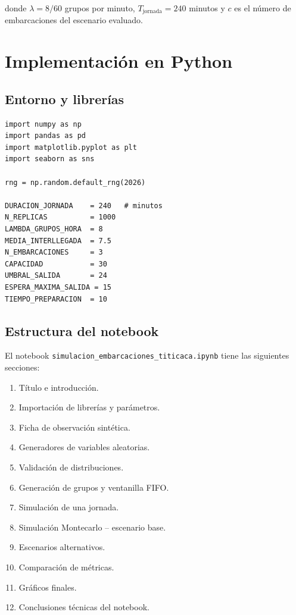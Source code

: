 \documentclass[12pt,a4paper]{article}
\begin{document}
\noindent donde $\lambda = 8/60$ grupos por minuto,
$T_{\text{jornada}} = 240$ minutos y $c$ es el número de embarcaciones
del escenario evaluado.

\section{Implementación en Python}

\subsection{Entorno y librerías}

\begin{lstlisting}[caption={Importaciones y parámetros globales}]
import numpy as np
import pandas as pd
import matplotlib.pyplot as plt
import seaborn as sns

rng = np.random.default_rng(2026)

DURACION_JORNADA    = 240   # minutos
N_REPLICAS          = 1000
LAMBDA_GRUPOS_HORA  = 8
MEDIA_INTERLLEGADA  = 7.5
N_EMBARCACIONES     = 3
CAPACIDAD           = 30
UMBRAL_SALIDA       = 24
ESPERA_MAXIMA_SALIDA = 15
TIEMPO_PREPARACION  = 10
\end{lstlisting}

\subsection{Estructura del notebook}

El notebook \texttt{simulacion\_embarcaciones\_titicaca.ipynb} tiene las
siguientes secciones:

\begin{enumerate}[noitemsep]
  \item Título e introducción.
  \item Importación de librerías y parámetros.
  \item Ficha de observación sintética.
  \item Generadores de variables aleatorias.
  \item Validación de distribuciones.
  \item Generación de grupos y ventanilla FIFO.
  \item Simulación de una jornada.
  \item Simulación Montecarlo -- escenario base.
  \item Escenarios alternativos.
  \item Comparación de métricas.
  \item Gráficos finales.
  \item Conclusiones técnicas del notebook.
\end{enumerate}
\end{document}
